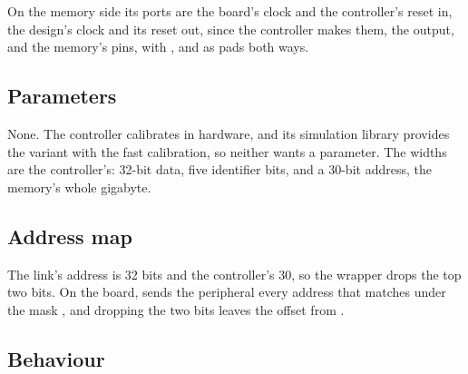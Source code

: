 On the memory side its ports are the board's clock and the
controller's reset in, the design's clock and its reset out, since the
controller makes them, the  output, and the memory's pins,
with ,  and  as pads both ways.

\subsection*{Parameters}

None. The controller calibrates in hardware, and its simulation
library provides the variant with the fast calibration, so neither
wants a parameter. The widths are the controller's: 32-bit data, five
identifier bits, and a 30-bit address, the memory's whole gigabyte.

\subsection*{Address map}

The link's address is 32 bits and the controller's 30, so the wrapper
drops the top two bits. On the board,  sends the
peripheral every address that matches  under the
mask , and dropping the two bits leaves the offset
from .


\subsection*{Behaviour}

